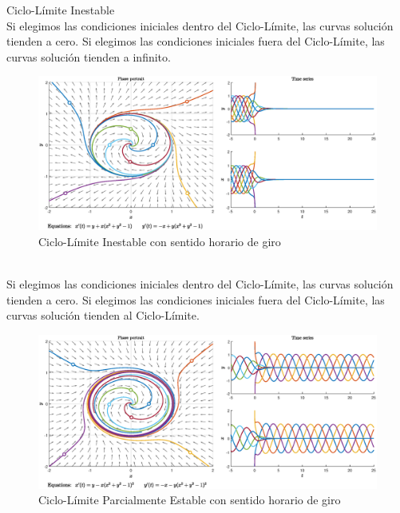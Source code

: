 \documentclass[12pt,a4paper]{report} %
\begin{document}
	\newpage
		
	{\Large\textbullet\quad Ciclo-Límite Inestable}\\[0.5cm]
	
	Si elegimos las condiciones iniciales dentro del Ciclo-Límite, las curvas solución tienden a cero. Si elegimos las condiciones iniciales fuera del Ciclo-Límite, las curvas solución tienden a infinito.
	
	\begin{figure}[h]
		\centering
		\includegraphics[width=1\textwidth]{cli.eps}
		\caption{Ciclo-Límite Inestable con sentido horario de giro}
		\label{fig:cli}
	\end{figure}\smallskip
	
	\vspace{0.5cm}{\Large\textbullet\quad Ciclo-Límite Parcialmente Estable}\\[0.5cm]
	
	Si elegimos las condiciones iniciales dentro del Ciclo-Límite, las curvas solución tienden a cero. Si elegimos las condiciones iniciales fuera del Ciclo-Límite, las curvas solución tienden al Ciclo-Límite.
	
	\begin{figure}[h]
		\centering
		\includegraphics[width=1\textwidth]{clpe.eps}
		\caption{Ciclo-Límite Parcialmente Estable con sentido horario de giro}
		\label{fig:clpe}
	\end{figure}\smallskip
	\newpage
	
\end{document}

